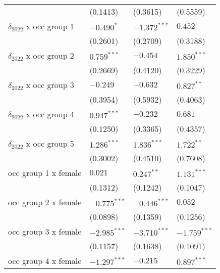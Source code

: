 \begin{tabular}{llll}
                                       &           (0.1413) &           (0.3615) &           (0.5559) \\
$\delta_{2022}$ x occ group 1          &         $-0.490^*$ &     $-1.372^{***}$ &            $0.452$ \\
                                       &           (0.2601) &           (0.2709) &           (0.3188) \\
$\delta_{2022}$ x occ group 2          &      $0.759^{***}$ &           $-0.454$ &      $1.850^{***}$ \\
                                       &           (0.2669) &           (0.4120) &           (0.3229) \\
$\delta_{2022}$ x occ group 3          &           $-0.249$ &           $-0.632$ &       $0.827^{**}$ \\
                                       &           (0.3954) &           (0.5932) &           (0.4063) \\
$\delta_{2022}$ x occ group 4          &      $0.947^{***}$ &           $-0.232$ &            $0.681$ \\
                                       &           (0.1250) &           (0.3365) &           (0.4357) \\
$\delta_{2022}$ x occ group 5          &      $1.286^{***}$ &      $1.836^{***}$ &       $1.722^{**}$ \\
                                       &           (0.3002) &           (0.4510) &           (0.7608) \\
occ group 1 x female                   &            $0.021$ &       $0.247^{**}$ &      $1.131^{***}$ \\
                                       &           (0.1312) &           (0.1242) &           (0.1047) \\
occ group 2 x female                   &     $-0.775^{***}$ &     $-0.446^{***}$ &            $0.052$ \\
                                       &           (0.0898) &           (0.1359) &           (0.1256) \\
occ group 3 x female                   &     $-2.985^{***}$ &     $-3.710^{***}$ &     $-1.759^{***}$ \\
                                       &           (0.1157) &           (0.1638) &           (0.1091) \\
occ group 4 x female                   &     $-1.297^{***}$ &           $-0.215$ &      $0.897^{***}$ \\

\end{tabular}
